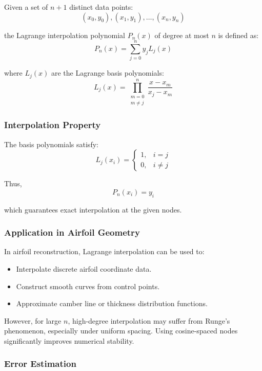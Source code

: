 Given a set of $n+1$ distinct data points:
\[
(x_0, y_0), (x_1, y_1), \dots, (x_n, y_n)
\]

the Lagrange interpolation polynomial $P_n(x)$ of degree at most $n$ is defined as:
\[
P_n(x) = \sum_{j=0}^{n} y_j L_j(x)
\]

where $L_j(x)$ are the Lagrange basis polynomials:
\[
L_j(x) = \prod_{\substack{m=0 \\ m \ne j}}^{n}
\frac{x - x_m}{x_j - x_m}
\]


\subsubsection*{Interpolation Property}

The basis polynomials satisfy:
\[
L_j(x_i) =
\begin{cases}
1, & i=j \\
0, & i \ne j
\end{cases}
\]

Thus,
\[
P_n(x_i) = y_i
\]

which guarantees exact interpolation at the given nodes.


\subsubsection*{Application in Airfoil Geometry}

In airfoil reconstruction, Lagrange interpolation can be used to:

\begin{itemize}
    \item Interpolate discrete airfoil coordinate data.
    \item Construct smooth curves from control points.
    \item Approximate camber line or thickness distribution functions.
\end{itemize}

However, for large $n$, high-degree interpolation may suffer from Runge's phenomenon, 
especially under uniform spacing. Using cosine-spaced nodes significantly improves numerical stability.


\subsubsection*{Error Estimation}

